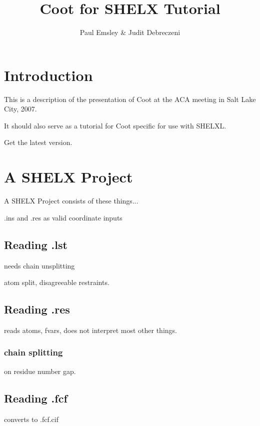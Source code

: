 \documentclass{article}
\title{Coot for SHELX Tutorial}
\author{Paul Emsley \& Judit Debreczeni}
\begin{document}
\maketitle
\tableofcontents


\section{Introduction}

This is a description of the presentation of Coot at the ACA meeting
in Salt Lake City, 2007.

It should also serve as a tutorial for Coot specific for use with
SHELXL.

Get the latest version.

\section{A SHELX Project}

A SHELX Project consists of these things...

.ins and .res as valid coordinate inputs

\subsection{Reading .lst}

needs chain unsplitting

atom split, disagreeable restraints.

\subsection{Reading .res}

reads atoms, fvars, does not interpret most other things.

\subsubsection{chain splitting}

on residue number gap.

\subsection{Reading .fcf}

converts to .fcf.cif




\end{document}

